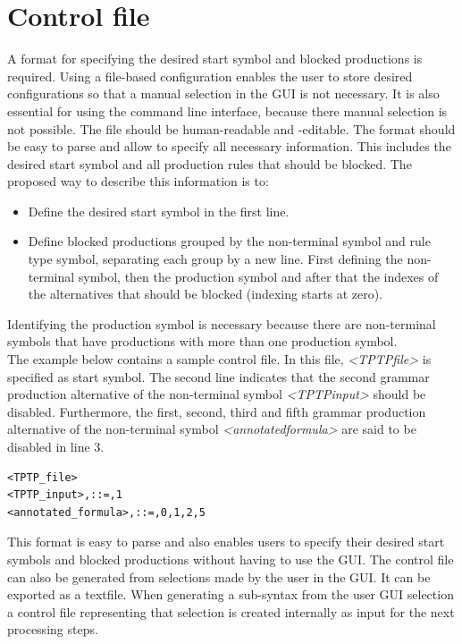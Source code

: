 \section{Control file}\label{sec:ConceptControlFile}

A format for specifying the desired start symbol and blocked productions is required.
Using a file-based configuration enables the user to store desired configurations so that a manual selection in the GUI is not necessary.
It is also essential for using the command line interface, because there manual selection is not possible.
The file should be human-readable and -editable.
The format should be easy to parse and allow to specify all necessary information.
This includes the desired start symbol and all production rules that should be blocked.
The proposed way to describe this information is to:

\begin{itemize}%
	\item Define the desired start symbol in the first line.
	\item Define blocked productions grouped by the non-terminal symbol and rule type symbol, separating each group by a new line.
	First defining the non-terminal symbol, then the production symbol and after that the indexes of the alternatives that should be blocked (indexing starts at zero).
\end{itemize}
Identifying the production symbol is necessary because there are non-terminal symbols that have productions with more than one production symbol.\\
The example below contains a sample control file.
In this file, \textit{\textless TPTP\textunderscore file\textgreater} is specified as start symbol.
The second line indicates that the second grammar production alternative of the non-terminal symbol \textit{\textless TPTP\textunderscore input\textgreater} should be disabled.
Furthermore, the first, second, third and fifth grammar production alternative of the non-terminal symbol \textit{\textless annotated\textunderscore formula\textgreater} are said to be disabled in line 3.

\begin{lstlisting}[caption= Control file,label= lst:ConceptControlFile]
<TPTP_file>
<TPTP_input>,::=,1
<annotated_formula>,::=,0,1,2,5
\end{lstlisting}
This format is easy to parse and also enables users to specify their desired start symbols and blocked productions without having to use the GUI. The control file can also be generated from selections made by the user in the GUI.
It can be exported as a textfile.
When generating a sub-syntax from the user GUI selection a control file representing that selection is created internally as input for the next processing steps.

